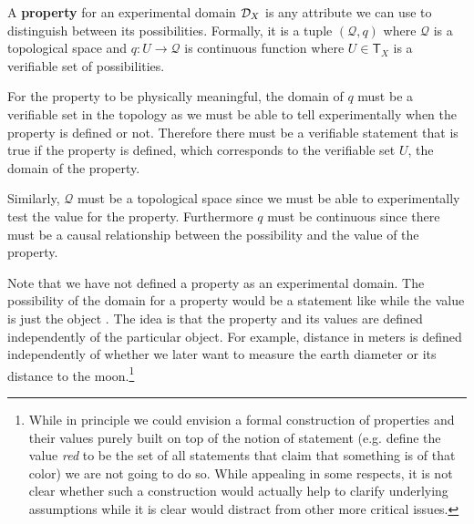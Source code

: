 \documentclass[11pt,letterpaper,fleqn]{memoir} %
\begin{document}
\begin{mathSection}
	\begin{defn}
		A \textbf{property} for an experimental domain $\mathcal{D}_X$ is any attribute we can use to distinguish between its possibilities. Formally, it is a tuple $(\mathcal{Q}, q)$ where $\mathcal{Q}$ is a topological space and $q : U \to \mathcal{Q}$ is continuous function where $U \in \mathsf{T}_X$ is a verifiable set of possibilities.
	\end{defn}
	\begin{justification}
		For the property to be physically meaningful, the domain of $q$ must be a verifiable set in the topology as we must be able to tell experimentally when the property is defined or not. Therefore there must be a verifiable statement that is true if the property is defined, which corresponds to the verifiable set $U$, the domain of the property.
		
		Similarly, $\mathcal{Q}$ must be a topological space since we must be able to experimentally test the value for the property. Furthermore $q$ must be continuous since there must be a causal relationship between the possibility and the value of the property.

	\end{justification}
\end{mathSection}
		
Note that we have not defined a property as an experimental domain. The possibility of the domain for a property would be a statement like  while the value is just the object . The idea is that the property and its values are defined independently of the particular object. For example, distance in meters is defined independently of whether we later want to measure the earth diameter or its distance to the moon.\footnote{While in principle we could envision a formal construction of properties and their values purely built on top of the notion of statement (e.g. define the value \emph{red} to be the set of all statements that claim that something is of that color) we are not going to do so. While appealing in some respects, it is not clear whether such a construction would actually help to clarify underlying assumptions while it is clear would distract from other more critical issues.}
\end{document}

